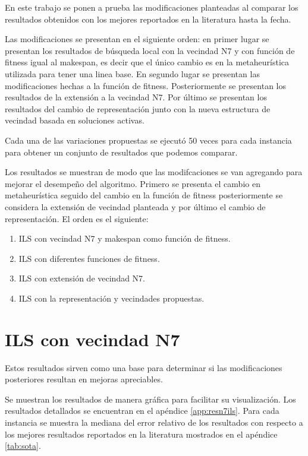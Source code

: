 En este trabajo se ponen a prueba las modificaciones planteadas al comparar los resultados obtenidos con los mejores reportados en la literatura hasta la fecha.

Las modificaciones se presentan en el siguiente orden: en primer lugar se presentan los resultados de búsqueda local con la vecindad N7 y con función de fitness igual al makespan, es decir que el único cambio es en la metaheurística utilizada para tener una linea base. En segundo lugar se presentan las modificaciones hechas a la función de fitness. Posteriormente se presentan los resultados de la extensión a la vecindad N7. Por último se presentan los resultados del cambio de representación junto con la nueva estructura de vecindad basada en soluciones activas.

Cada una de las variaciones propuestas se ejecutó 50 veces para cada instancia para obtener un conjunto de resultados que podemos comparar.

Los resultados se muestran de modo que las modifcaciones se van agregando para mejorar el desempeño del algoritmo. Primero se presenta el cambio en metaheurística seguido del cambio en la función de fitness posteriormente se considera la extensión de vecindad planteada y por último el cambio de representación. El orden es el siguiente:
\begin{enumerate}
    \item ILS con vecindad N7 y makespan como función de fitness.
    \item ILS con diferentes funciones de fitness.
    \item ILS con extensión de vecindad N7.
    \item ILS con la representación y vecindades propuestas.
\end{enumerate}
\section{ILS con vecindad N7}
Estos resultados sirven como una base para determinar si las modificaciones posteriores resultan en mejoras apreciables.

Se muestran los resultados de manera gráfica para facilitar su visualización. Los resultados detallados se encuentran en el apéndice \ref{app:resn7ils}. Para cada instancia se muestra la mediana del error relativo de los resultados con respecto a los mejores resultados reportados en la literatura mostrados en el apéndice \ref{tab:sota}. 

